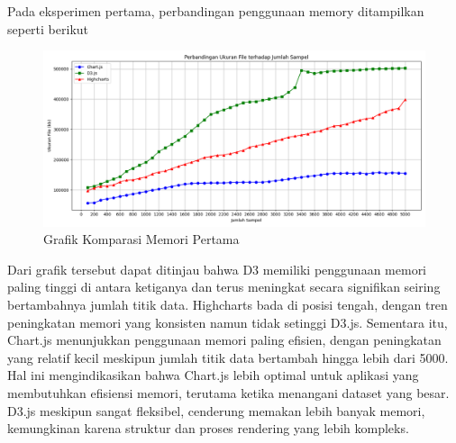Pada eksperimen pertama, perbandingan penggunaan memory ditampilkan seperti
berikut
	\begin{figure}[H]
	\centering
	\includegraphics[width=0.8\linewidth]{gambar/Pembahasan/FIX_Memori/Figure_1.png}
	\caption{Grafik Komparasi Memori Pertama}
	\label{Grafik Komparasi Memori Pertama}
\end{figure}

Dari grafik tersebut dapat ditinjau bahwa D3 memiliki penggunaan
memori paling tinggi di antara ketiganya dan terus meningkat secara
signifikan seiring bertambahnya jumlah titik data. Highcharts bada di posisi
tengah, dengan tren peningkatan memori yang konsisten namun tidak setinggi
D3.js. Sementara itu, Chart.js menunjukkan penggunaan memori paling
efisien, dengan peningkatan yang relatif kecil meskipun jumlah titik data
bertambah hingga lebih dari 5000. Hal ini mengindikasikan bahwa Chart.js
lebih optimal untuk aplikasi yang membutuhkan efisiensi memori, terutama
ketika menangani dataset yang besar. D3.js meskipun sangat fleksibel,
cenderung memakan lebih banyak memori, kemungkinan karena struktur dan
proses rendering yang lebih kompleks. 

